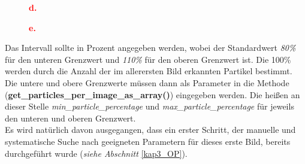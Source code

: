 \begin{figure}[H]
  \centering
  \begin{center}
  	\textcolor{red}{\textbf{{\large d.}}}
  \end{center}
  \label{fig:kap3_strukto_part_per_array_t4}
\end{figure}

\begin{figure}[H]
  \centering
  \begin{center}
  	\textcolor{red}{\textbf{{\large e.}}}
  \end{center}
  \label{fig:kap3_strukto_part_per_array_t5}
\end{figure}


Das Intervall sollte in Prozent angegeben werden, wobei der Standardwert \textit{80\%} für den unteren Grenzwert und \textit{110\%} für den oberen Grenzwert ist. Die 100\% werden durch die Anzahl der im allerersten Bild erkannten Partikel bestimmt. Die untere und obere Grenzwerte müssen dann als Parameter in die Methode (\textbf{get\_particles\_per\_image\_as\_array()}) eingegeben werden. Die heißen an dieser Stelle \textit{min\_particle\_percentage} und \textit{max\_particle\_percentage} für jeweils  den unteren und oberen Grenzwert.\\
Es wird natürlich davon ausgegangen, dass ein erster Schritt, der manuelle und systematische Suche nach geeigneten Parametern für dieses erste Bild, bereits durchgeführt wurde (\textit{siehe Abschnitt} \ref{kap3_OP}).\\

